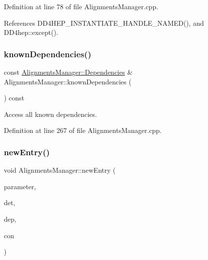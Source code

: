 Definition at line 78 of file Alignments\+Manager.\+cpp.



References D\+D4\+H\+E\+P\+\_\+\+I\+N\+S\+T\+A\+N\+T\+I\+A\+T\+E\+\_\+\+H\+A\+N\+D\+L\+E\+\_\+\+N\+A\+M\+E\+D(), and D\+D4hep\+::except().

\hypertarget{class_d_d4hep_1_1_alignments_1_1_alignments_manager_a3b8e5bdbb4729648a65289235fd80c61}{}\label{class_d_d4hep_1_1_alignments_1_1_alignments_manager_a3b8e5bdbb4729648a65289235fd80c61} 
\subsubsection{\texorpdfstring{known\+Dependencies()}{knownDependencies()}}
{\footnotesize\ttfamily const \hyperlink{class_d_d4hep_1_1_alignments_1_1_alignments_manager_ae8068cb8b252db1243c87eccad69e980}{Alignments\+Manager\+::\+Dependencies} \& Alignments\+Manager\+::known\+Dependencies (\begin{DoxyParamCaption}{ }\end{DoxyParamCaption}) const}



Access all known dependencies. 



Definition at line 267 of file Alignments\+Manager.\+cpp.

\hypertarget{class_d_d4hep_1_1_alignments_1_1_alignments_manager_a193ada1fb36be0e72fa92f83a4610c80}{}\label{class_d_d4hep_1_1_alignments_1_1_alignments_manager_a193ada1fb36be0e72fa92f83a4610c80} 
\subsubsection{\texorpdfstring{new\+Entry()}{newEntry()}}
{\footnotesize\ttfamily void Alignments\+Manager\+::new\+Entry (\begin{DoxyParamCaption}\item[{const \hyperlink{class_d_d4hep_1_1_alignments_1_1_alignments_manager_a6756d14a9af79dbc28296c765f6bf581}{Context} \&}]{parameter,  }\item[{\hyperlink{class_d_d4hep_1_1_geometry_1_1_det_element}{Det\+Element} \&}]{det,  }\item[{const \hyperlink{class_d_d4hep_1_1_alignments_1_1_alignments_manager_a62dad65e1472f8939e5a83f859e96d26}{Dependency} $\ast$}]{dep,  }\item[{\hyperlink{class_d_d4hep_1_1_alignments_1_1_alignment_condition}{Alignment\+Condition} \&}]{con }\end{DoxyParamCaption})\hspace{0.3cm}{\ttfamily [static]}}



